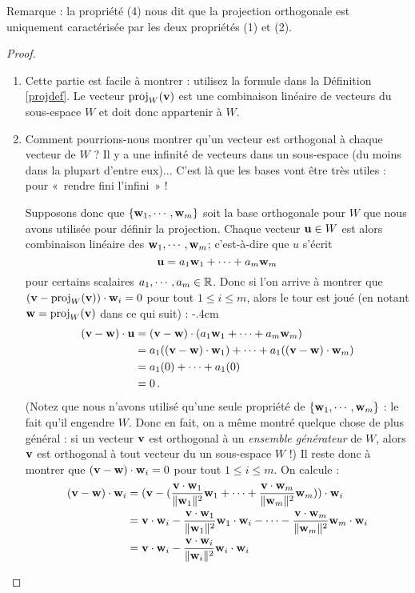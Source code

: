 Remarque : la propriété (4) nous dit que la projection orthogonale
est uniquement caractérisée par les deux propriétés (1) et (2).


\begin{proof} 
\begin{enumerate}[(1)]
	\item Cette partie est facile à montrer : utilisez la formule dans la Définition \ref{projdef}. Le vecteur $\operatorname{proj}_W(\mathbf{v})$ est une combinaison linéaire de vecteurs du sous-espace $W$ et doit donc appartenir à $W$.

	\item Comment pourrions-nous montrer qu'un vecteur est orthogonal à chaque vecteur de $W$ ? Il y a une infinité de vecteurs dans un sous-espace (du moins dans la plupart d'entre eux)...  C'est là que les bases vont être très utiles : pour «~rendre fini l'infini~» ! 

Supposons donc que $\{\mathbf{w}_1, \cdots, \mathbf{w}_m\}$ soit la base orthogonale pour $W$ que nous avons utilisée pour définir la projection. Chaque vecteur $\mathbf{u}\in W$ est alors combinaison linéaire des $\mathbf{w}_1, \cdots, \mathbf{w}_m $; c'est-à-dire que $u$ s'écrit
 $$\mathbf{u} =a_1 \mathbf{w}_1 +\cdots + a_m \mathbf{w}_m$$ pour certains scalaires $a_1, \cdots, a_m\in\mathbb{R}$. 
 Donc si l'on arrive à montrer que $(\mathbf{v}-\operatorname{proj}_W(\mathbf{v}))\cdot \mathbf{w}_i=0$ pour tout $1\le i \le m$, alors le tour est joué (en notant $\mathbf{w}=\operatorname{proj}_W(\mathbf{v})$ dans ce qui suit) :
\vglue-.4cm
\begin{align*} 
(\mathbf{v}-\mathbf{w}) \cdot \mathbf{u} &=(\mathbf{v}-\mathbf{w})\cdot (a_1 \mathbf{w}_1 +\cdots + a_m \mathbf{w}_m) \\
&=a_1((\mathbf{v}-\mathbf{w})\cdot \mathbf{w}_1) +\cdots +a_1((\mathbf{v}-\mathbf{w})\cdot \mathbf{w}_m)\\
&=a_1(0) +\cdots +a_1(0)\\&=0\,.
\end{align*}
(Notez que nous n'avons utilisé qu'une seule propriété de $\{\mathbf{w}_1, \cdots, \mathbf{w}_m\}$ : le fait qu'il engendre $W$. Donc en fait, on a même montré quelque chose de plus général : si un vecteur $\mathbf{v}$ est orthogonal à un {\it ensemble g\'en\'erateur} de $W$, alors $\mathbf{v}$ est orthogonal à tout vecteur du un sous-espace $W$ !)
Il reste donc à montrer que $(\mathbf{v}-\mathbf{w})\cdot \mathbf{w}_i=0$ pour tout $1\le i \le m$. On calcule : 
\begin{align*}
 (\mathbf{v}-\mathbf{w})\cdot\mathbf{w}_i  &=
(\mathbf{v} - (\frac{\mathbf{v}\cdot \mathbf{w}_1}{\Vert \mathbf{w}_1\Vert^2}\mathbf{w}_1 + \cdots 
+ 
\frac{\mathbf{v}\cdot \mathbf{w}_m}{\Vert \mathbf{w}_m\Vert^2}\mathbf{w}_m))\cdot \mathbf{w}_i \\
 &= \mathbf{v} \cdot \mathbf{w}_i - \frac{\mathbf{v}\cdot \mathbf{w}_1}{\Vert \mathbf{w}_1\Vert^2}\mathbf{w}_1 \cdot \mathbf{w}_i - \cdots - \frac{\mathbf{v}\cdot \mathbf{w}_m}{\Vert \mathbf{w}_m\Vert^2}\mathbf{w}_m \cdot \mathbf{w}_i\\
&= \mathbf{v} \cdot \mathbf{w}_i - \frac{\mathbf{v}\cdot \mathbf{w}_i}{\Vert \mathbf{w}_i\Vert^2}\mathbf{w}_i \cdot \mathbf{w}_i
\end{align*}


\end{enumerate}
\end{proof}
